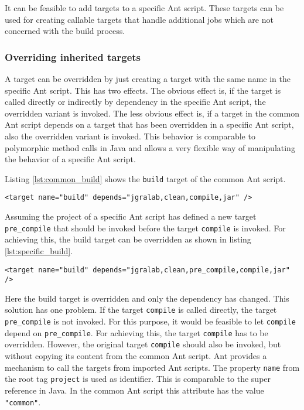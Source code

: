 \documentclass[a4paper,twoside,11pt,bibtotoc]{article}
\begin{document}

It can be feasible to add targets to a specific Ant script.
These targets can be used for creating callable targets that handle additional jobs which are not concerned with the build process.%

\subsubsection{Overriding inherited targets}
\label{sec:override}
A target can be overridden by just creating a target with the same name in the specific Ant script.
This has two effects.
The obvious effect is, if the target is called directly or indirectly by dependency in the specific Ant script, the overridden variant is invoked.
The less obvious effect is, if a target in the common Ant script depends on a target that has been overridden in a specific Ant script, also the overridden variant is invoked.
This behavior is comparable to polymorphic method calls in Java and allows a very flexible way of manipulating the behavior of a specific Ant script.

Listing \ref{lst:common_build} shows the \texttt{build} target of the common Ant script.
\begin{lstlisting}[caption=Target build in the common Ant script,label=lst:common_build,float=!ht,language=Ant]
	<target name="build" depends="jgralab,clean,compile,jar" />
\end{lstlisting}

Assuming the project of a specific Ant script has defined a new target \texttt{pre\_compile} that should be invoked before the target \texttt{compile} is invoked.
For achieving this, the build target can be overridden as shown in listing \ref{lst:specific_build}.

\begin{lstlisting}[caption=Target build in a specific Ant script,label=lst:specific_build,float=!ht,language=Ant]
	<target name="build" depends="jgralab,clean,pre_compile,compile,jar" />
\end{lstlisting}

Here the build target is overridden and only the dependency has changed.
This solution has one problem.
If the target \texttt{compile} is called directly, the target \texttt{pre\_compile} is not invoked.
For this purpose, it would be feasible to let \texttt{compile} depend on \texttt{pre\_compile}.
For achieving this, the target \texttt{compile} has to be overridden.
However, the original target \texttt{compile} should also be invoked, but without copying its content from the common Ant script.
Ant provides a mechanism to call the targets from imported Ant scripts.
The property \texttt{name} from the root tag \texttt{project} is used as identifier.
This is comparable to the super reference in Java.
In the common Ant script this attribute has the value \texttt{"common"}.
\end{document}
